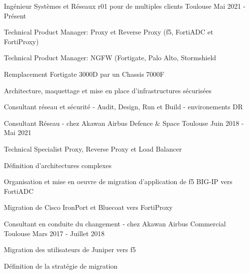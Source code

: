 

\begin{cventries}

  \cventry
    {Ingénieur Systèmes et Réseaux} %
    {r01 pour de multiples clients} %
    {Toulouse} %
    {Mai 2021 - Présent} %
    {
      \begin{cvitems} %
        \item {Technical Product Manager: Proxy et Reverse Proxy (f5, FortiADC et FortiProxy) }
        \item {Technical Product Manager: NGFW (Fortigate, Palo Alto, Stormshield}
        \item {Remplacement Fortigate 3000D par un Chassis 7000F}
        \item {Architecture, maquettage et mise en place d'infrastructures sécurisées}
        \item {Consultant réseau et sécurité - Audit, Design, Run et Build - environements DR}
      \end{cvitems}
    }

  \cventry
    {Consultant Réseau - chez Akawan} %
    {Airbus Defence \& Space} %
    {Toulouse} %
    {Juin 2018 - Mai 2021} %
    {
      \begin{cvitems} %
        \item {Technical Specialist Proxy, Reverse Proxy et Load Balancer}
        \item {Définition d'architectures complexes}
        \item {Organisation et mise en oeuvre de migration d'application de f5 BIG-IP vers FortiADC}
        \item {Migration de Cisco IronPort et Bluecoat vers FortiProxy}
      \end{cvitems}
    }

  \cventry
    {Consultant en conduite du changement - chez Akawan} %
    {Airbus Commercial} %
    {Toulouse} %
    {Mars 2017 - Juillet 2018} %
    {
      \begin{cvdoubleitems} %
        \item {Migration des utilisateurs de Juniper vers f5}
        \item {Définition de la stratégie de migration}
      \end{cvdoubleitems}
    }


\end{cventries}
